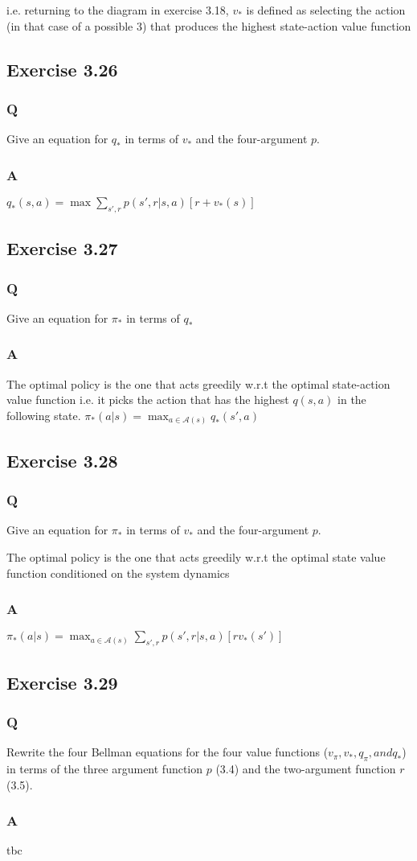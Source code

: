 i.e. returning to the diagram in exercise 3.18, $v_*$ is defined as selecting the action (in that case of a possible 3) that produces the highest state-action value function

\subsection{Exercise 3.26}
\subsubsection*{Q}
Give an equation for $q_*$ in terms of $v_*$ and the four-argument $p$.

\subsubsection*{A}
$
q_*(s,a) = \max \sum_{s', r} p(s', r | s, a)[r + v_*(s)]
$

\subsection{Exercise 3.27}
\subsubsection*{Q}
Give an equation for $\pi_*$ in terms of $q_*$

\subsubsection*{A}
The optimal policy is the one that acts greedily w.r.t the optimal state-action value function i.e. it picks the action that has the highest $q(s,a)$ in the following state.
$
\pi_*(a|s) = \max_{a \in \mathcal{A}(s)} q_*(s',a)
$

\subsection{Exercise 3.28}
\subsubsection*{Q}
Give an equation for $\pi_*$ in terms of $v_*$ and the four-argument $p$.

The optimal policy is the one that acts greedily w.r.t the optimal state value function conditioned on the system dynamics
\subsubsection*{A}
$
\pi_*(a|s) = \max_{a \in \mathcal{A}(s)} \sum_{s', r} p(s', r | s, a)[r  v_*(s')]
$

\subsection{Exercise 3.29}
\subsubsection*{Q}
Rewrite the four Bellman equations for the four value functions ($v_\pi, v_*, q_\pi,and q_*$) in terms of the three argument function $p$ (3.4) and the two-argument function $r$ (3.5).

\subsubsection*{A}
tbc